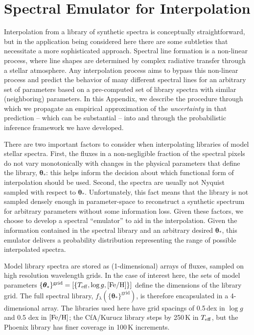\documentclass[iop,floatfix,numberedappendix,twocolappendix]{emulateapj}
\newcommand{\Z}{[{\rm Fe}/{\rm H}]}
\newcommand{\vt}{ {\bm \theta}}
\begin{document}
\appendix

\section{Spectral Emulator for Interpolation} \label{sec:Appendix}

Interpolation from a library of synthetic spectra is conceptually straightforward, but in the 
application being considered here there are some subtleties that necessitate a more sophisticated 
approach.  Spectral line formation is a non-linear process, where line shapes are determined by 
complex radiative transfer through a stellar atmosphere.  Any interpolation process aims to bypass 
this non-linear process and predict the behavior of many different spectral lines for an arbitrary 
set of parameters based on a pre-computed set of library spectra with similar (neighboring) 
parameters.  In this Appendix, we describe the procedure through which we propagate an empirical 
approximation of the {\it uncertainty} in that prediction -- which can be substantial -- into and 
through the probabilistic inference framework we have developed.

There are two important factors to consider when interpolating libraries of model stellar spectra.  
First, the fluxes in a non-negligible fraction of the spectral pixels do not vary monotonically 
with changes in the physical parameters that define the library, $\vt_{\ast}$: this helps inform 
the decision about which functional form of interpolation should be used.  Second, the spectra 
are usually not Nyquist sampled with respect to $\vt_{\ast}$.  Unfortunately, this fact means that 
the library is not sampled densely enough in parameter-space to reconstruct a synthetic spectrum 
for arbitrary parameters without some information loss.  Given these factors, we choose to develop 
a spectral ``emulator'' to aid in the interpolation.  Given the information contained in 
the spectral library and an arbitrary desired $\vt_{\ast}$, this emulator delivers a probability 
distribution representing the range of possible interpolated spectra. 

Model library spectra are stored as (1-dimensional) arrays of fluxes, sampled on high resolution 
wavelength grids.  In the case of interest here, the sets of model parameters 
$\{\vt_{\ast}\}^\textrm{grid} = [\{T_{\rm eff}, \log g,  \Z \}]$ define the dimensions of the 
library grid.  The full spectral library, $f_{\lambda}(\{\vt_{\ast}\}^\textrm{grid})$, is therefore 
encapsulated in a 4-dimensional array.  The libraries used here have grid spacings of 0.5\,dex in 
$\log g$ and 0.5 dex in $\Z$; the {\sc CfA/Kurucz} library steps by 250\,K in $T_{\rm eff}$, but 
the {\sc Phoenix} library has finer coverage in 100\,K increments.  
\end{document}
